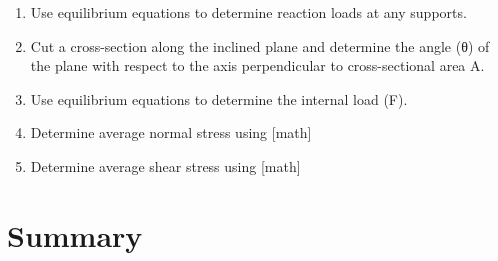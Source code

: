 \documentclass[
  letterpaper,
  DIV=11,
  numbers=noendperiod]{scrreprt}
\begin{document}
\begin{tcolorbox}[enhanced jigsaw, colback=white, colframe=quarto-callout-note-color-frame, leftrule=.75mm, opacitybacktitle=0.6, colbacktitle=quarto-callout-note-color!10!white, arc=.35mm, bottomrule=.15mm, breakable, title={Step-by-step:}, left=2mm, titlerule=0mm, toptitle=1mm, toprule=.15mm, opacityback=0, rightrule=.15mm, coltitle=black, bottomtitle=1mm]

\begin{enumerate}
\def\labelenumi{\arabic{enumi}.}
\item
  Use equilibrium equations to determine reaction loads at any supports.
\item
  Cut a cross-section along the inclined plane and determine the angle
  (θ) of the plane with respect to the axis perpendicular to
  cross-sectional area A.
\item
  Use equilibrium equations to determine the internal load (F).
\item
  Determine average normal stress using {[}math{]}
\item
  Determine average shear stress using {[}math{]}
\end{enumerate}

\end{tcolorbox}

\section{Summary}\label{summary-1}
\end{document}
